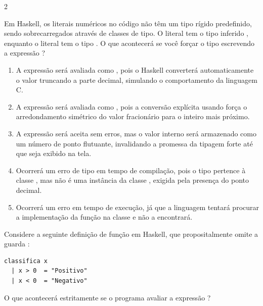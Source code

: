 \documentclass[a4paper,10pt,brazil]{article}
\begin{document}
\begin{multicols}{2}
\begin{enumerate}
\end{enumerate}

Em Haskell, os literais numéricos no código não têm um tipo rígido predefinido, sendo sobrecarregados através de classes de tipo. O literal  tem o tipo inferido , enquanto o literal  tem o tipo . 
O que acontecerá se você forçar o tipo escrevendo a expressão ?

\begin{enumerate}
  \item A expressão será avaliada como , pois o Haskell converterá automaticamente o valor truncando a parte decimal, simulando o comportamento da linguagem C.

  \item A expressão será avaliada como , pois a conversão explícita usando \haskellinline{::} força o arredondamento simétrico do valor fracionário para o inteiro mais próximo.

  \item A expressão será aceita sem erros, mas o valor interno será armazenado como um número de ponto flutuante, invalidando a promessa da tipagem forte até que seja exibido na tela.

  \item Ocorrerá um erro de tipo em tempo de compilação, pois o tipo  pertence à classe , mas não é uma instância da classe , exigida pela presença do ponto decimal.

  \item Ocorrerá um erro em tempo de execução, já que a linguagem tentará procurar a implementação da função  na classe  e não a encontrará.


\end{enumerate}

Considere a seguinte definição de função em Haskell, que propositalmente omite a guarda :

\begin{verbatim}
classifica x
  | x > 0  = "Positivo"
  | x < 0  = "Negativo"
\end{verbatim}

O que acontecerá estritamente se o programa avaliar a expressão ?


\end{multicols}
\end{document}
